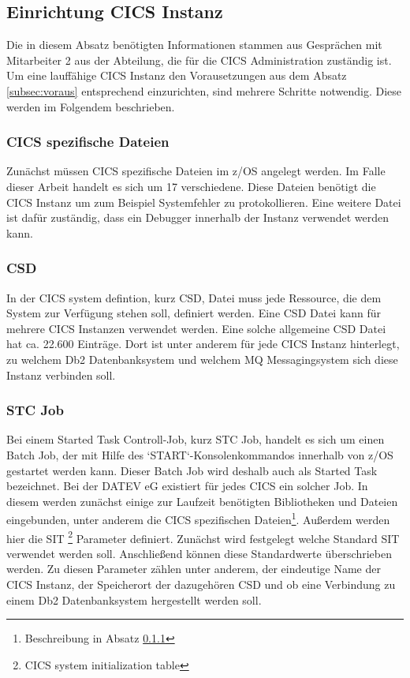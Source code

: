 \subsection{Einrichtung CICS Instanz}\label{subsec:createCICS}
Die in diesem Absatz benötigten Informationen stammen aus Gesprächen mit Mitarbeiter 2 aus der Abteilung, die für die CICS Administration zuständig ist.
Um eine lauffähige CICS Instanz den Vorausetzungen aus dem Absatz \ref{subsec:voraus} entsprechend einzurichten, sind mehrere Schritte notwendig.
Diese werden im Folgendem beschrieben.

\subsubsection{CICS spezifische Dateien}\label{sssec:speziDat}
Zunächst müssen CICS spezifische Dateien im z/OS angelegt werden.
Im Falle dieser Arbeit handelt es sich um 17 verschiedene.
Diese Dateien benötigt die CICS Instanz um zum Beispiel Systemfehler zu protokollieren.
Eine weitere Datei ist dafür zuständig, dass ein Debugger innerhalb der Instanz verwendet werden kann.

\subsubsection{CSD}
In der CICS system defintion, kurz CSD, Datei muss jede Ressource, die dem System zur Verfügung stehen soll, definiert werden.
Eine CSD Datei kann für mehrere CICS Instanzen verwendet werden.
Eine solche allgemeine CSD Datei hat ca. 22.600 Einträge.
Dort ist unter anderem für jede CICS Instanz hinterlegt, zu welchem Db2 Datenbanksystem und welchem MQ Messagingsystem sich diese Instanz verbinden soll.

\subsubsection{STC Job}
Bei einem Started Task Controll-Job, kurz STC Job, handelt es sich um einen Batch Job, der mit Hilfe des `START`-Konsolenkommandos innerhalb von z/OS gestartet werden kann.
Dieser Batch Job wird deshalb auch als Started Task bezeichnet.\cite{Cassier.2007}
Bei der DATEV eG existiert für jedes CICS ein solcher Job.
In diesem werden zunächst einige zur Laufzeit benötigten Bibliotheken und Dateien eingebunden, unter anderem die CICS spezifischen Dateien\footnote{Beschreibung in Absatz \ref{sssec:speziDat}}.
Außerdem werden hier die SIT \footnote{CICS system initialization table} Parameter definiert.
Zunächst wird festgelegt welche Standard SIT verwendet werden soll.
Anschließend können diese Standardwerte überschrieben werden.
Zu diesen Parameter zählen unter anderem, der eindeutige Name der CICS Instanz, der Speicherort der dazugehören CSD und ob eine Verbindung zu einem Db2 Datenbanksystem hergestellt werden soll.

